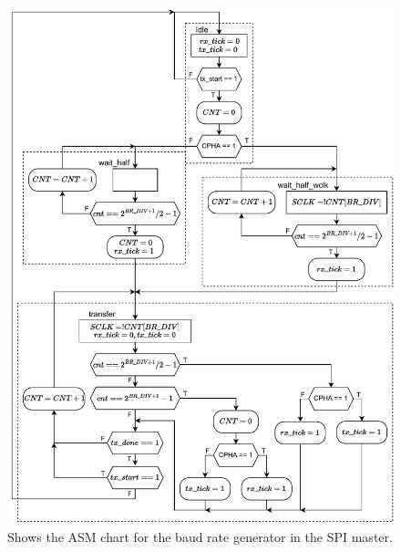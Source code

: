 \documentclass[./dissertation.tex]{subfiles}
\begin{document}
\begin{figure}[H]
    \centering
    \includegraphics[width=\linewidth]{subfiles/imgs/IP_Blocks_Pics/spi_brg.pdf}
    \caption{Shows the ASM chart for the baud rate generator in the SPI master.}
    \label{fig:spi_brg}
\end{figure}

\end{document}

